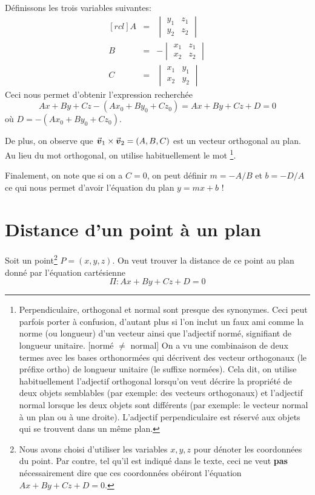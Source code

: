 Définissons les trois variables suivantes:
\[
\begin{matrix}[rcl]
A &=& \begin{vmatrix}
y_1 & z_1\\
y_2 & z_2
\end{vmatrix}\\
B &=& - \begin{vmatrix}
x_1 & z_1 \\
x_2 & z_2
\end{vmatrix} \\
C&=& \begin{vmatrix}
x_1 & y_1 \\
x_2 & y_2
\end{vmatrix}
\end{matrix}
\]
Ceci nous permet d'obtenir l'expression recherchée
\[
Ax + By + Cz - (Ax_0 + By_0 + Cz_0) = Ax + By + Cz + D = 0
\]
où $D = - (Ax_0 + By_0 + Cz_0)$.

De plus, on observe que $\vec{\boldsymbol{v}}_1 \times \vec{\boldsymbol{v}}_2 = (A, B, C)$ est un vecteur
orthogonal au plan.  Au lieu du mot orthogonal, on utilise
habituellement le mot \footnote{Perpendiculaire, 
orthogonal et normal sont presque des synonymes.  Ceci peut parfois porter à confusion,
d'autant plus si l'on inclut un faux ami comme la norme (ou longueur) d'un vecteur ainsi
que l'adjectif normé, signifiant de longueur unitaire. [normé $\neq$ normal]  On a vu une combinaison de 
deux termes avec les bases orthonormées qui décrivent des vecteur orthogonaux (le préfixe ortho) 
de longueur unitaire (le suffixe normées).  Cela dit, on utilise habituellement l'adjectif
orthogonal lorsqu'on veut décrire la propriété de deux objets semblables (par exemple: des
vecteurs orthogonaux) et l'adjectif normal lorsque les deux objets sont différents (par exemple:
le vecteur normal à un plan ou à une droite).  L'adjectif perpendiculaire est réservé aux 
objets qui se trouvent dans un même plan.}.

Finalement, on note que si on a $C=0$, on peut définir $m = -A/B$ et $b= -D/A$ ce qui nous
permet d'avoir l'équation du plan $y=mx+b$ !

\section{Distance d'un point à un plan}

Soit un point\footnote{Nous avons choisi d'utiliser les variables $x, y, z$ pour
dénoter les coordonnées du point. Par contre, tel qu'il est indiqué dans le texte, ceci ne veut
\textbf{pas} nécessairement dire que ces coordonnées obéiront l'équation $Ax+By+Cz+D=0$.}
 $P=(x, y, z)$.  
On veut trouver la distance de ce point au plan donné par l'équation cartésienne
\[
\Pi: Ax + By + Cz + D = 0
\]

